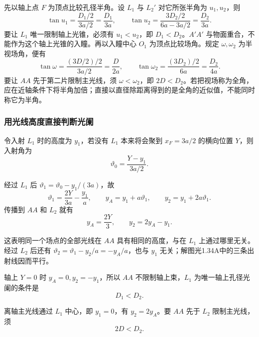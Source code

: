 \documentclass[UTF8,fontset=fandol,a4paper,11pt]{ctexart}
\begin{document}
先以轴上点 $F$ 为顶点比较孔径半角。设 $L_1$ 与 $L_2'$ 对它所张半角为 $u_1,u_2$，则
\[
\tan u_1=\frac{D_1/2}{3a/2}=\frac{D_1}{3a},\qquad
\tan u_2=\frac{3D_2/2}{6a-3a/2}=\frac{D_2}{3a}.
\]
要让 $L_1$ 唯一限制轴上光锥，必须有 $u_1<u_2$，即 $D_1<D_2$。$A'A'$ 与物面重合，不能作为这个轴上光锥的入瞳。再以入瞳中心 $O_1$ 为顶点比较场角。规定 $\omega,\omega_2$ 为半视场角，便有
\[
\tan\omega=\frac{(3D/2)/2}{3a/2}=\frac{D}{2a},\qquad
\tan\omega_2=\frac{(3D_2)/2}{6a}=\frac{D_2}{4a}.
\]
要让 $AA$ 先于第二片限制主光线，须 $\omega<\omega_2$，即 $2D<D_2$。若把视场称为全角，应在近轴条件下将半角加倍；直接以直径除距离得到的是全角的近似值，不能同时称它为半角。

\subsubsection*{用光线高度直接判断光阑}
令入射 $L_1$ 时的高度为 $y_1$，若没有 $L_1$ 本来将会聚到 $x_F=3a/2$ 的横向位置 $Y$，则入射角为
\[
\vartheta_0=\frac{Y-y_1}{3a/2}.
\]

经过 $L_1$ 后 $\vartheta_1=\vartheta_0-y_1/(3a)$，故
\[
\vartheta_1=\frac{2Y}{3a}-\frac{y_1}{a},\qquad
y_A=y_1+a\vartheta_1,\qquad
y_2=y_1+2a\vartheta_1.
\]
传播到 $AA$ 和 $L_2$ 就有
\[
\boxed{y_A=\frac{2Y}{3}},\qquad
\boxed{y_2=2y_A-y_1}.
\]

这表明同一个场点的全部光线在 $AA$ 具有相同的高度，与在 $L_1$ 上通过哪里无关。经过 $L_2$ 后还有 $\vartheta_2=\vartheta_1-y_2/a=-y_A/a$，也与 $y_1$ 无关；解图光1.34A中的三条出射线因而平行。

轴上 $Y=0$ 时 $y_A=0,y_2=-y_1$，所以 $AA$ 不限制轴上束，$L_1$ 为唯一轴上孔径光阑的条件是
\[
\boxed{D_1<D_2}.
\]

离轴主光线通过 $L_1$ 中心，即 $y_1=0$，有 $y_2=2y_A$。要 $AA$ 先于 $L_2$ 限制主光线，须
\[
\boxed{2D<D_2}.
\]
\end{document}
